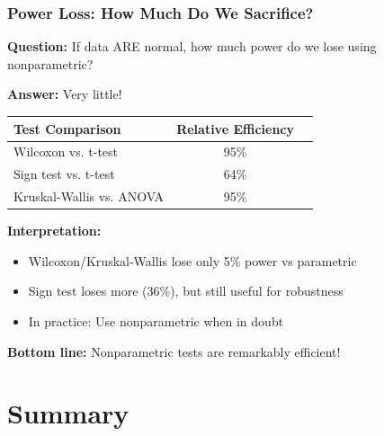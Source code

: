 \documentclass{beamer}
\begin{document}
\begin{frame}[fragile]
\frametitle{Power Loss: How Much Do We Sacrifice?}
\textbf{Question:} If data ARE normal, how much power do we lose using nonparametric?

\vspace{0.5cm}
\textbf{Answer:} Very little!

\vspace{0.3cm}
\begin{center}
\begin{tabular}{lcc}
\toprule
\textbf{Test Comparison} & \textbf{Relative Efficiency} \\
\midrule
Wilcoxon vs. t-test & 95\% \\
Sign test vs. t-test & 64\% \\
Kruskal-Wallis vs. ANOVA & 95\% \\
\bottomrule
\end{tabular}
\end{center}

\vspace{0.5cm}
\textbf{Interpretation:}
\begin{itemize}
\item Wilcoxon/Kruskal-Wallis lose only 5\% power vs parametric
\item Sign test loses more (36\%), but still useful for robustness
\item In practice: Use nonparametric when in doubt
\end{itemize}

\vspace{0.3cm}
\textbf{Bottom line:} Nonparametric tests are remarkably efficient!
\end{frame}

\section{Summary}
\end{document}
